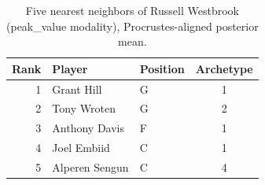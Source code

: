 \begin{table}[htbp]
  \centering\small
  \begin{tabular}{rllc}
    \toprule
    Rank & Player & Position & Archetype \\
    \midrule
    1 & Grant Hill & G & 1 \\
    2 & Tony Wroten & G & 2 \\
    3 & Anthony Davis & F & 1 \\
    4 & Joel Embiid & C & 1 \\
    5 & Alperen Sengun & C & 4 \\
    \bottomrule
  \end{tabular}
  \caption{Five nearest neighbors of Russell Westbrook (peak_value modality), Procrustes-aligned posterior mean.}
  \label{tab:Russell_Westbrook_neighbors_peak_value}
\end{table}


